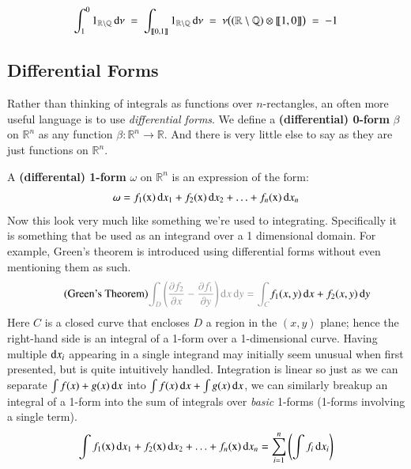\begin{equation}
	\int_1^0 1_{\mathbb{R}\setminus \mathbb{Q}} \mathop{}\!\mathrm{d} \nu
		\;=\; \int_{[\![0,1]\!]} 1_{\mathbb{R}\setminus \mathbb{Q}} \mathop{}\!\mathrm{d} \nu
		\;=\; \nu \big( (\mathbb{R}\setminus\mathbb{Q} ) \otimes [\![1,0]\!] \big)
		\;=\; -1
\end{equation}


\subsection{Differential Forms}

Rather than thinking of integrals as functions over $n$-rectangles, an often more useful language is to use 
\emph{differential forms}.
We define a \textbf{(differential) 0-form} $\beta$ on $\mathbb{R}^n$ as any function 
$\beta : \mathbb{R}^n \to \mathbb{R}$.
And there is very little else to say as they are just functions on $\mathbb{R}^n$.



A \textbf{(differental) 1-form} $\omega$ on $\mathbb{R}^n$ is an expression of the form:
\begin{equation}
	\omega = f_1(\text{x}) \mathop{}\!\mathrm{d} x_1 + f_2(\text{x}) \mathop{}\!\mathrm{d} x_2 + \ldots + f_n(\text{x}) \mathop{}\!\mathrm{d} x_n
\end{equation}
Now this look very much like something we're used to integrating.
Specifically it is something that be used as an integrand over a 1 dimensional domain.
For example, Green's theorem is introduced using differential forms without even mentioning them as such.
\begin{equation}
	\tag{Green's Theorem}
	\textcolor{black!40}{
		\int_D \left( \frac{\partial f_2}{\partial x} - \frac{\partial f_1}{\partial y}  \right) \diff x \diff y 
		=\int_{C}
	} f_1(x,y) \diff x + f_2(x,y) \diff y
\end{equation}
Here $C$ is a closed curve that encloses $D$ a region in the $(x,y)$ plane; hence the right-hand side is an integral of
a 1-form over a 1-dimensional curve.
Having multiple $\mathop{}\!\mathrm{d} x_i$ appearing in a single integrand may initially seem unusual when first presented, 
but is quite intuitively handled.
Integration is linear so just as we can separate $\int f(x) + g(x) \mathop{}\!\mathrm{d} x$ into $\int f(x) \mathop{}\!\mathrm{d} x + \int g(x) \mathop{}\!\mathrm{d} x$, 
we can similarly breakup an integral of a 1-form into the sum of integrals over \emph{basic} 1-forms 
(1-forms involving a single term).
\begin{equation}
	\int f_1(\text{x}) \mathop{}\!\mathrm{d} x_1 
		+ f_2(\text{x}) \mathop{}\!\mathrm{d} x_2 
		+ \ldots 
		+ f_n(\text{x}) \mathop{}\!\mathrm{d} x_n
	=	\sum_{i=1}^n \left( \int f_i \mathop{}\!\mathrm{d} x_i \right)
\end{equation}


